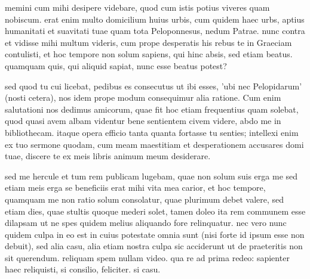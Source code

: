 


 memini cum mihi desipere videbare, quod cum istis potius viveres quam nobiscum. erat enim multo domicilium huius urbis, cum quidem haec urbs, aptius humanitati et suavitati tuae quam tota Peloponnesus, nedum Patrae. nunc contra et vidisse mihi multum videris, cum prope desperatis his rebus te in Graeciam contulisti, et hoc tempore non solum sapiens, qui hinc absis, sed etiam beatus. quamquam quis, qui aliquid sapiat, nunc esse beatus potest?

 sed quod tu cui licebat, pedibus es consecutus ut ibi esses, 'ubi nec Pelopidarum' (nosti cetera), nos idem prope modum consequimur alia ratione. Cum enim salutationi nos dedimus amicorum, quae fit hoc etiam frequentius quam solebat, quod quasi avem albam videntur bene sentientem civem videre, abdo me in bibliothecam. itaque opera efficio tanta quanta fortasse tu senties; intellexi enim ex tuo sermone quodam, cum meam maestitiam et desperationem accusares domi tuae, discere te ex meis libris animum meum desiderare.

 sed me hercule et tum rem publicam lugebam, quae non solum suis erga me sed etiam meis erga se beneficiis erat mihi vita mea carior, et hoc tempore, quamquam me non ratio solum consolatur, quae plurimum debet valere, sed etiam dies, quae stultis quoque mederi solet, tamen doleo ita rem communem esse dilapsam ut ne spes quidem melius aliquando fore relinquatur. nec vero nunc quidem culpa in eo est in cuius potestate omnia sunt (nisi forte id ipsum esse non debuit), sed alia casu, alia etiam nostra culpa sic acciderunt ut de praeteritis non sit querendum. reliquam spem nullam video. qua re ad prima redeo: sapienter haec reliquisti, si consilio, feliciter. si casu.
